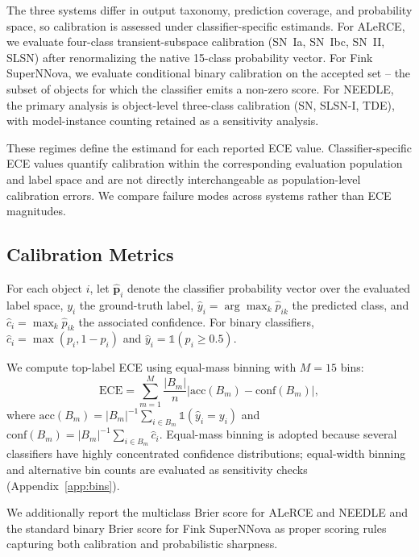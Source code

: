 \documentclass[a4paper,fleqn,usenatbib]{mnras}
\begin{document}
The three systems differ in output taxonomy, prediction coverage,
and probability space, so calibration is assessed under
classifier-specific estimands. For ALeRCE, we evaluate
four-class transient-subspace calibration (SN~Ia, SN~Ibc, SN~II,
SLSN) after renormalizing the native 15-class probability vector.
For Fink SuperNNova, we evaluate conditional binary calibration on
the accepted set -- the subset of objects for which the classifier
emits a non-zero score. For NEEDLE, the primary analysis is
object-level three-class calibration (SN, SLSN-I, TDE), with
model-instance counting retained as a sensitivity analysis.

These regimes define the estimand for each reported ECE value.
Classifier-specific ECE values quantify calibration within the
corresponding evaluation population and label space and are not
directly interchangeable as population-level calibration errors.
We compare failure modes across systems rather than ECE magnitudes.

\subsection{Calibration Metrics}\label{sec:cal_metrics}

For each object $i$, let $\hat{\mathbf{p}}_i$ denote the
classifier probability vector over the evaluated label space,
$y_i$ the ground-truth label, $\hat{y}_i = \arg\max_k
\hat{p}_{ik}$ the predicted class, and $\hat{c}_i = \max_k
\hat{p}_{ik}$ the associated confidence. For binary classifiers,
$\hat{c}_i = \max(p_i, 1-p_i)$ and $\hat{y}_i =
\mathbb{1}(p_i \geq 0.5)$.

We compute top-label ECE using equal-mass binning with $M = 15$
bins:
\begin{equation}
    \mathrm{ECE} = \sum_{m=1}^{M} \frac{|B_m|}{n}
    \left| \mathrm{acc}(B_m) - \mathrm{conf}(B_m) \right|,
    \label{eq:ece_methods}
\end{equation}
where $\mathrm{acc}(B_m) = |B_m|^{-1} \sum_{i \in B_m}
\mathbb{1}(\hat{y}_i = y_i)$ and $\mathrm{conf}(B_m) =
|B_m|^{-1} \sum_{i \in B_m} \hat{c}_i$. Equal-mass binning is
adopted because several classifiers have highly concentrated
confidence distributions; equal-width binning and alternative bin
counts are evaluated as sensitivity checks
(Appendix~\ref{app:bins}).

We additionally report the multiclass Brier score
\citep{brier1950} for ALeRCE and NEEDLE and the standard binary
Brier score for Fink SuperNNova as proper scoring rules capturing
both calibration and probabilistic sharpness.
\end{document}
